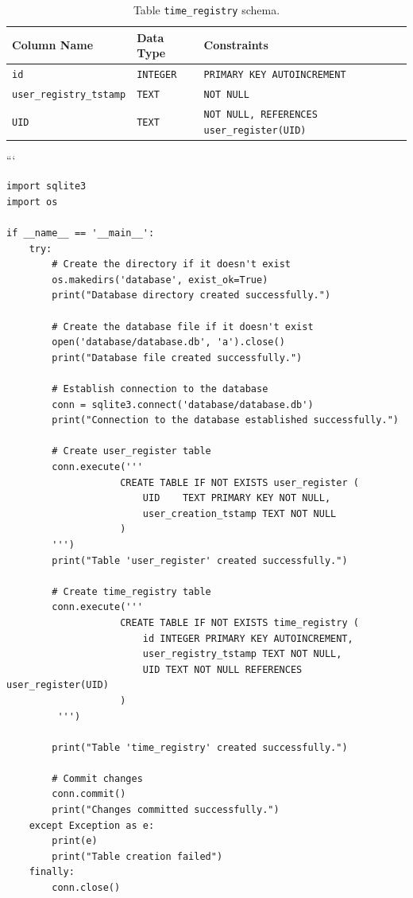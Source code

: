 \documentclass{article}
\begin{document}
\begin{table}[H]
	\centering
	\begin{tabular}{|l|l|p{8cm}|}
	\hline
	\textbf{Column Name} & \textbf{Data Type} & \textbf{Constraints} \\ \hline
	\texttt{id} & \texttt{INTEGER} & \texttt{PRIMARY KEY AUTOINCREMENT} \\ \hline
	\texttt{user\_registry\_tstamp} & \texttt{TEXT} & \texttt{NOT NULL} \\ \hline
	\texttt{UID} & \texttt{TEXT} & \texttt{NOT NULL, REFERENCES user\_register(UID)} \\ \hline
	\end{tabular}
	\caption{Table \texttt{time\_registry} schema.}
	\end{table}
```
\begin{lstlisting}
import sqlite3
import os

if __name__ == '__main__':
    try:
        # Create the directory if it doesn't exist
        os.makedirs('database', exist_ok=True)
        print("Database directory created successfully.")

        # Create the database file if it doesn't exist
        open('database/database.db', 'a').close()
        print("Database file created successfully.")

        # Establish connection to the database
        conn = sqlite3.connect('database/database.db')
        print("Connection to the database established successfully.")

        # Create user_register table
        conn.execute('''
                    CREATE TABLE IF NOT EXISTS user_register (
                        UID    TEXT PRIMARY KEY NOT NULL,
                        user_creation_tstamp TEXT NOT NULL
                    )
        ''')
        print("Table 'user_register' created successfully.")

        # Create time_registry table
        conn.execute('''
                    CREATE TABLE IF NOT EXISTS time_registry (
                        id INTEGER PRIMARY KEY AUTOINCREMENT,
                        user_registry_tstamp TEXT NOT NULL,
                        UID TEXT NOT NULL REFERENCES user_register(UID)
                    )
         ''')

        print("Table 'time_registry' created successfully.")

        # Commit changes
        conn.commit()
        print("Changes committed successfully.")
    except Exception as e:
        print(e)
        print("Table creation failed")
    finally:
        conn.close()

\end{lstlisting}
\end{document}
